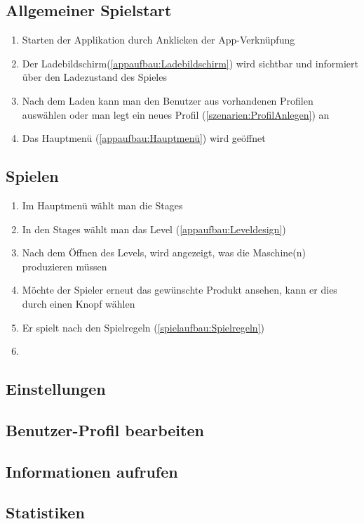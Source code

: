 \documentclass{scrartcl}
\begin{document}
\subsection{Allgemeiner Spielstart}
	\begin{enumerate}
		\item Starten der Applikation durch Anklicken der App-Verknüpfung
		\item Der Ladebildschirm(\ref{appaufbau:Ladebildschirm}) wird sichtbar und informiert über den Ladezustand des Spieles
		\item Nach dem Laden kann man den Benutzer aus vorhandenen Profilen auswählen oder man legt ein neues Profil (\ref{szenarien:ProfilAnlegen}) an
		\item Das Hauptmenü (\ref{appaufbau:Hauptmenü}) wird geöffnet		
	\end{enumerate}
	
\subsection{Spielen} 
	\begin{enumerate}
		\item Im Hauptmenü wählt man die Stages
		\item In den Stages wählt man das Level (\ref{appaufbau:Leveldesign})
		\item Nach dem Öffnen des Levels, wird angezeigt, was die Maschine(n) produzieren müssen
		\item Möchte der Spieler erneut das gewünschte Produkt ansehen, kann er dies durch einen Knopf wählen
		\item Er spielt nach den Spielregeln (\ref{spielaufbau:Spielregeln})
		\item 
	\end{enumerate}
	
\subsection{Einstellungen}

\subsection{Benutzer-Profil bearbeiten}

\subsection{Informationen aufrufen}

\subsection{Statistiken}
\end{document}
